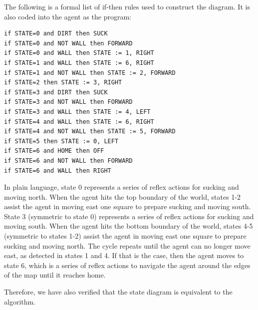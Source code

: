 The following is a formal list of if-then rules used to construct the diagram. It is also coded into the agent as the program:

\begin{verbatim}
if STATE=0 and DIRT then SUCK
if STATE=0 and NOT WALL then FORWARD
if STATE=0 and WALL then STATE := 1, RIGHT
if STATE=1 and WALL then STATE := 6, RIGHT
if STATE=1 and NOT WALL then STATE := 2, FORWARD
if STATE=2 then STATE := 3, RIGHT
if STATE=3 and DIRT then SUCK
if STATE=3 and NOT WALL then FORWARD
if STATE=3 and WALL then STATE := 4, LEFT
if STATE=4 and WALL then STATE := 6, RIGHT
if STATE=4 and NOT WALL then STATE := 5, FORWARD
if STATE=5 then STATE := 0, LEFT
if STATE=6 and HOME then OFF
if STATE=6 and NOT WALL then FORWARD
if STATE=6 and WALL then RIGHT
\end{verbatim}

In plain language, state 0 represents a series of reflex actions for sucking and moving north. When the agent hits the top boundary of the world, states 1-2 assist the agent in moving east one square to prepare sucking and moving south. State 3 (symmetric to state 0) represents a series of reflex actions for sucking and moving south. When the agent hits the bottom boundary of the world, states 4-5 (symmetric to states 1-2) assist the agent in moving east one square to prepare sucking and moving north. The cycle repeats until the agent can no longer move east, as detected in states 1 and 4. If that is the case, then the agent moves to state 6, which is a series of reflex actions to navigate the agent around the edges of the map until it reaches home.

Therefore, we have also verified that the state diagram is equivalent to the algorithm.


